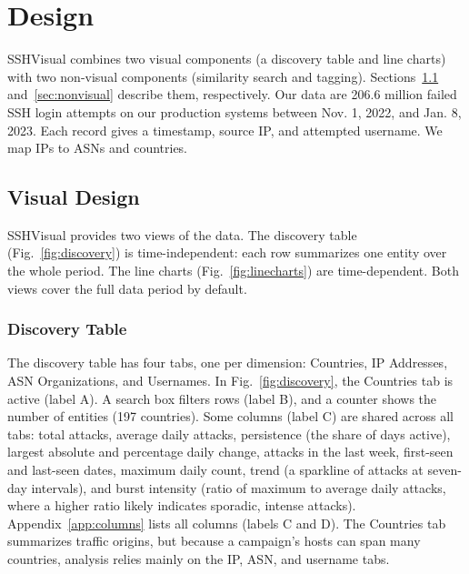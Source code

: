 \documentclass[conference]{IEEEtran}
\newcommand{\ui}[1]{{\sffamily\hyphenchar\font=-1 #1}}
\begin{document}
\section{Design}
\label{sec:design}

SSHVisual combines two visual components (a discovery table and line charts) with two non-visual components (similarity search and tagging).
Sections~\ref{sec:visual} and~\ref{sec:nonvisual} describe them, respectively. Our data are 206.6 million failed SSH login attempts on
our production systems between Nov. 1, 2022, and Jan. 8, 2023. Each record gives a timestamp, source IP, and attempted username. 
We map IPs to ASNs and countries.

\subsection{Visual Design}
\label{sec:visual}

SSHVisual provides two views of the data. The discovery table (Fig.~\ref{fig:discovery}) is time-independent: each row summarizes one entity over the whole period.
The line charts (Fig.~\ref{fig:linecharts}) are time-dependent. Both views cover the full data period by default.

\subsubsection{Discovery Table}
\label{sec:table}




The discovery table has four tabs, one per dimension: \ui{Countries}, \ui{IP Addresses}, \ui{ASN Organizations}, and \ui{Usernames}.
In Fig.~\ref{fig:discovery}, the \ui{Countries}
tab is active (label A). A search box filters rows (label B), and a counter shows the number
of entities (197 countries).
Some columns (label C) are shared across all tabs: total attacks, average daily attacks, persistence (the share of days active),
largest absolute and percentage daily change, attacks in the last week, first-seen and last-seen dates, maximum daily count,
trend (a sparkline of attacks at seven-day intervals), and burst intensity (ratio of maximum to average daily attacks, where a higher ratio likely indicates
sporadic, intense attacks). Appendix~\ref{app:columns} lists all columns (labels C and D). The \ui{Countries} tab summarizes traffic origins, 
but because a campaign’s hosts can span many countries, analysis relies mainly on the IP, ASN, and username tabs.
\end{document}
